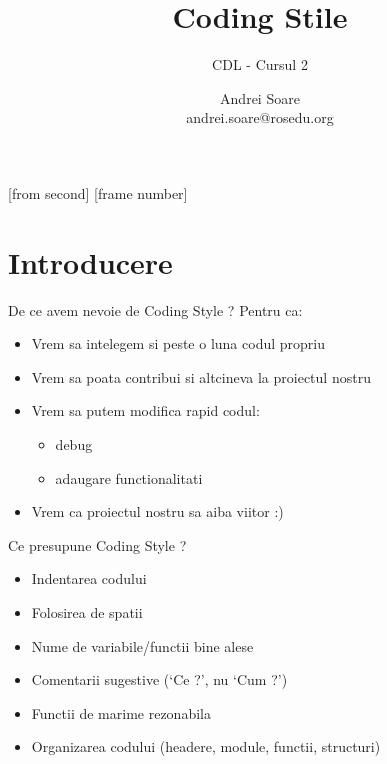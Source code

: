 \documentclass{beamer}
\title[Coding Style]{Coding Stile}
\subtitle{CDL - Cursul 2}
\institute{ROSEdu}
\author{Andrei Soare \\ {\footnotesize andrei.soare@rosedu.org}}
\begin{document}
[from second]
[frame number]

\frame{\titlepage}

\frame{\tableofcontents}


\section{Introducere}

  \frame{\tableofcontents[currentsection]}

  \begin{frame}{De ce avem nevoie de Coding Style ?}
  Pentru ca:
  \begin{itemize}
  \pause \item Vrem sa intelegem si peste o luna codul propriu
  \pause \item Vrem sa poata contribui si altcineva la proiectul nostru
  \pause \item Vrem sa putem modifica rapid codul:\begin{itemize} \item debug \item adaugare functionalitati \end{itemize}
  \pause \item Vrem ca proiectul nostru sa aiba viitor :)
  \end{itemize}
  \end{frame}

  \begin{frame}{Ce presupune Coding Style ?}
  \begin{itemize}
  \item Indentarea codului
  \item Folosirea de spatii
  \item Nume de variabile/functii bine alese
  \item Comentarii sugestive ({\ttfamily `Ce ?'}, nu {\ttfamily `Cum ?'})
  \item Functii de marime rezonabila
  \item Organizarea codului (headere, module, functii, structuri)
  \end{itemize}
  \end{frame}
\end{document}
